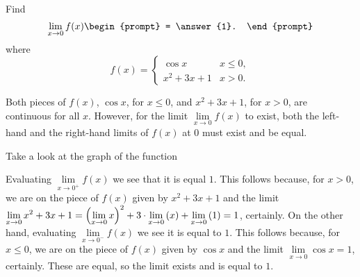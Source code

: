 \documentclass{ximera}
\author{Gregory Hartman \and Matthew Carr}
\begin{document}
\begin{exercise}



  Find 
  \[
  \displaystyle \lim_{x\to 0} f(x)
  \begin{prompt}
  = \answer{1}.
  \end{prompt}
  \]
  where
  \[
  f(x) = \left\{\begin{array}{cl} \cos x & x\leq 0, \\ x^2+3x+1 & x>0. \end{array}\right.
  \]
    \begin{hint}
     Both pieces of $f(x)$, $\cos x$, for $x\leq0$, and $x^2+3x+1$, for $x>0$, are continuous for all $x$. However, for the limit $\lim\limits_{x\to0}f(x)$ to exist, both the left-hand and the right-hand limits of $f(x)$ at $0$ must exist and be equal.
    \end{hint}
     \begin{hint}
    	Take a look at the graph of the function
    \begin{center}
      \end{center} 
    \end{hint}
    \begin{hint}
     Evaluating $\lim\limits_{x\to0^{+}}f(x)$ we see that it is equal $1$. This follows because, for $x>0$, we are on the piece of $f(x)$ given by $x^2+3x+1$ and the limit $\lim\limits_{x\to0}x^2+3x+1=\p{\lim\limits_{x\to0}x}^2+3\cdot\lim\limits_{x\to0}\p{x}+\lim\limits_{x\to0}\p{1}=1$, certainly. On the other hand, evaluating $\lim\limits_{x\to0^{-}}f(x)$ we see it is equal to $1$. This follows because, for $x\leq0$, we are on the piece of $f(x)$ given by $\cos x$ and the limit $\lim\limits_{x\to0}\cos x=1$, certainly. These are equal, so the limit exists and is equal to $1$.
    \end{hint}
\end{exercise}
\end{document}
